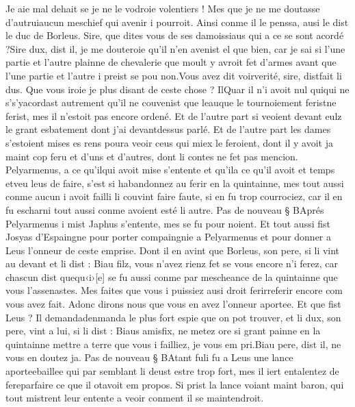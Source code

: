 \documentclass{article}
\begin{document}
\begin{pages}
   Je aie mal dehait se je ne le vodroie volentiers ! Mes que je ne me doutasse 
      d’autruiaucun meschief qui avenir i pourroit.
   Ainsi conme il le penssa, ausi le dist 
   le duc de Borleus.
   Sire, que dites vous de ses damoissiaus qui a ce se sont acordé ?Sire dux, dist il, je me douteroie qu’il n’en avenist el que bien, car je sai si l’une partie et 
      l’autre plainne de chevalerie que moult y avroit fet d’armes avant que 
      l’une partie et l’autre i preist se pou non.Vous avez dit 
      voirverité, sire, 
      distfait li dus. \pend
\pstart Que vous iroie je plus disant de ceste chose ? 
   IlQuar il n’i avoit nul 
   quiqui ne 
   s’s'yacordast 
   autrement
   qu’il ne couvenist que leauque le tournoiement 
   feristne ferist,
   mes il n’estoit pas encore ordené. Et de l’autre part si veoient devant eulz le grant esbatement dont j’ai 
      devantdessus parlé. 
   Et de l’autre part les dames s’estoient mises es rens poura veoir ceus qui 
   miex le feroient, dont il y avoit ja maint cop feru et d’uns et d’autres, dont li contes ne fet pas mencion. 
   Pelyarmenus, a ce qu’ilqui avoit mise 
   s’entente et qu'ila ce qu'il avoit 
   et temps etveu leus
   de faire, s’est si habandonnez au ferir en la quintainne, 
   mes tout aussi conme aucun i avoit failli li couvint faire faute, si en fu trop courrociez, car il en fu escharni tout aussi 
   conme avoient esté li autre. \pend
\pstart Pas de nouveau § BAprés Pelyarmenus 
   i mist Japhus s’entente, mes se fu pour noient.
   Et tout aussi fist Josyas d’Espaingne
   pour porter compaingnie a Pelyarmenus et pour donner a 
   Leus l’onneur de ceste emprise. Dont il en avint que
   Borleus, son pere, si li vint au devant et li dist :
   Biau filz, vous n’avez rienz fet se vous encore n’i ferez, car chascun dist 
      quequ‹i›[e] se fu aussi conme par mescheance 
         de la quintainne que vous l’assenastes. 
      Mes faites que vous i puissiez ausi droit ferirreferir 
      encore com vous avez fait. Adonc dirons nous que vous en avez l’onneur aportee.
   Et que fist Leus ? Il 
   demandadenmanda le plus fort 
   espie que on pot trouver, et li dux, son pere, vint a lui, si li dist :
   Biaus amisfix, ne metez ore si grant 
      painne en la quintainne mettre a terre que vous i failliez, je vous em pri.Biau pere, dist il, ne vous en doutez ja. \pend
\pstart Pas de nouveau § BAtant 
   fuli fu 
   a Leus une lance 
   aporteebaillee qui par semblant li deust estre trop fort, mes il iert entalentez 
   de fereparfaire ce que il 
   otavoit em propos.
   Si prist la lance voiant maint baron, qui tout mistrent leur entente a veoir conment il se maintendroit. 

\end{pages}
\end{document}
